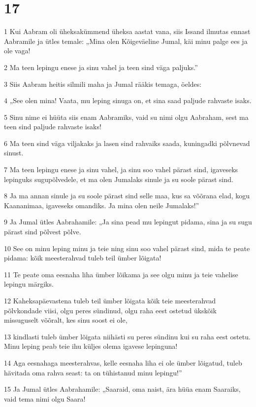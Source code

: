 \chapter{17}

\par 1 Kui Aabram oli üheksakümmend üheksa aastat vana, siis Issand ilmutas ennast Aabramile ja ütles temale: „Mina olen Kõigeväeline Jumal, käi minu palge ees ja ole vaga!
\par 2 Ma teen lepingu enese ja sinu vahel ja teen sind väga paljuks.”
\par 3 Siis Aabram heitis silmili maha ja Jumal rääkis temaga, öeldes:
\par 4 „See olen mina! Vaata, mu leping sinuga on, et sina saad paljude rahvaste isaks.
\par 5 Sinu nime ei hüüta siis enam Aabramiks, vaid su nimi olgu Aabraham, sest ma teen sind paljude rahvaste isaks!
\par 6 Ma teen sind väga viljakaks ja lasen sind rahvaiks saada, kuningadki põlvnevad sinust.
\par 7 Ma teen lepingu enese ja sinu vahel, ja sinu soo vahel pärast sind, igaveseks lepinguks sugupõlvedele, et ma olen Jumalaks sinule ja su soole pärast sind.
\par 8 Ja ma annan sinule ja su soole pärast sind selle maa, kus sa võõrana elad, kogu Kaananimaa, igaveseks omandiks. Ja mina olen neile Jumalaks!”
\par 9 Ja Jumal ütles Aabrahamile: „Ja sina pead mu lepingut pidama, sina ja su sugu pärast sind põlvest põlve.
\par 10 See on minu leping minu ja teie ning sinu soo vahel pärast sind, mida te peate pidama: kõik meesterahvad tuleb teil ümber lõigata!
\par 11 Te peate oma eesnaha liha ümber lõikama ja see olgu minu ja teie vahelise lepingu märgiks.
\par 12 Kaheksapäevastena tuleb teil ümber lõigata kõik teie meesterahvad põlvkondade viisi, olgu peres sündinud, olgu raha eest ostetud ükskõik missuguselt võõralt, kes sinu soost ei ole,
\par 13 kindlasti tuleb ümber lõigata niihästi su peres sündinu kui su raha eest ostetu. Minu leping peab teie ihu küljes olema igavese lepinguna!
\par 14 Aga eesnahaga meesterahvas, kelle eesnaha liha ei ole ümber lõigatud, tuleb hävitada oma rahva seast: ta on tühistanud minu lepingu!”
\par 15 Ja Jumal ütles Aabrahamile: „Saaraid, oma naist, ära hüüa enam Saaraiks, vaid tema nimi olgu Saara!
